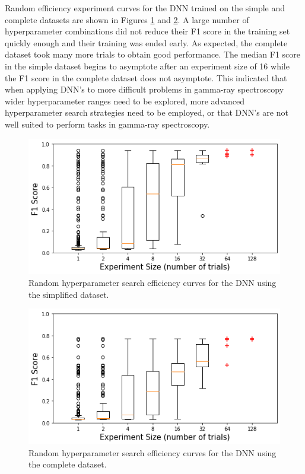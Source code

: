 Random efficiency experiment curves for the DNN trained on the simple and complete datasets are shown in Figures \ref{fig:random_hp_search_dnn_easy} and \ref{fig:random_hp_search_dnn_full}. A large number of hyperparameter combinations did not reduce their F1 score in the training set quickly enough and their training was ended early. As expected, the complete dataset took many more trials to obtain good performance. The median F1 score in the simple dataset begins to asymptote after an experiment size of 16 while the F1 score in the complete dataset does not asymptote. This indicated that when applying DNN's to more difficult problems in gamma-ray spectroscopy wider hyperparameter ranges need to be explored, more advanced hyperparameter search strategies need to be employed, or that DNN's are not well suited to perform tasks in gamma-ray spectroscopy. 

\begin{figure}[H]
	\centering
	\includegraphics[width=0.8\linewidth]{images/random_hp_search_dnn_easy}
	\caption{Random hyperparameter search efficiency curves for the DNN using the simplified dataset.}
	\label{fig:random_hp_search_dnn_easy}
\end{figure}

\begin{figure}[H]
	\centering
	\includegraphics[width=0.8\linewidth]{images/random_hp_search_dnn_full}
	\caption{Random hyperparameter search efficiency curves for the DNN using the complete dataset.}
	\label{fig:random_hp_search_dnn_full}
\end{figure}


